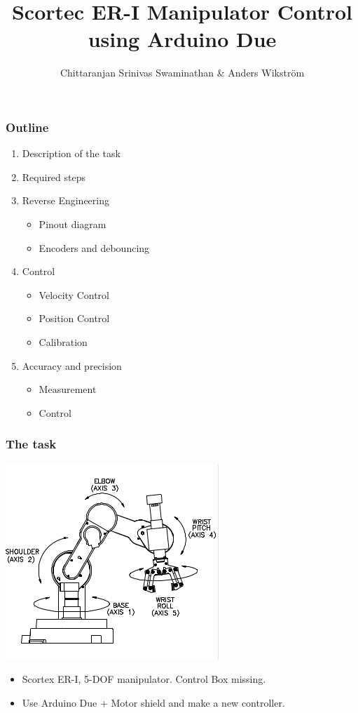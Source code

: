 \documentclass{beamer}
\title[Sensors Assignment 3]
{Scortec ER-I Manipulator Control using Arduino Due}
\author
{Chittaranjan Srinivas Swaminathan \& Anders Wikström}
\institute{Örebro University}
\begin{document}
\frame{\titlepage}
  \begin{frame}
    \frametitle{Outline}
    \begin{enumerate}
      \item Description of the task
      \item Required steps
      \item Reverse Engineering
        \begin{itemize}
          \item Pinout diagram
          \item Encoders and debouncing
        \end{itemize}
      \item Control
        \begin{itemize}
          \item Velocity Control
          \item Position Control
          \item Calibration
        \end{itemize}
      \item Accuracy and precision
        \begin{itemize}
          \item Measurement 
          \item Control
        \end{itemize}
    \end{enumerate}

  \end{frame}
  \begin{frame}
    \frametitle{The task}
    \centering
    \includegraphics[scale=0.75]{../Report/axes.png}
    \begin{itemize}
      \item<1-> Scortex ER-I, 5-DOF manipulator. Control Box missing.
      \item<2-> Use Arduino Due + Motor shield and make a new controller.
    \end{itemize}
  \end{frame}
  
\end{document}
